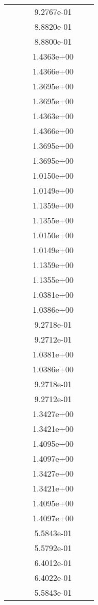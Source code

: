 \begin{xltabular}{\textwidth}{r|rS[table-format=1.3e+2]S[table-format=1.4e+2]S[table-format=1.4e+2]S[table-format=-1.5]}
&  &  & 9.2767e-01 & & \\
&  &  & 8.8820e-01 & & \\
&  &  & 8.8800e-01 & & \\
&  &  & 1.4363e+00 & & \\
&  &  & 1.4366e+00 & & \\
&  &  & 1.3695e+00 & & \\
&  &  & 1.3695e+00 & & \\
&  &  & 1.4363e+00 & & \\
&  &  & 1.4366e+00 & & \\
&  &  & 1.3695e+00 & & \\
&  &  & 1.3695e+00 & & \\
&  &  & 1.0150e+00 & & \\
&  &  & 1.0149e+00 & & \\
&  &  & 1.1359e+00 & & \\
&  &  & 1.1355e+00 & & \\
&  &  & 1.0150e+00 & & \\
&  &  & 1.0149e+00 & & \\
&  &  & 1.1359e+00 & & \\
&  &  & 1.1355e+00 & & \\
&  &  & 1.0381e+00 & & \\
&  &  & 1.0386e+00 & & \\
&  &  & 9.2718e-01 & & \\
&  &  & 9.2712e-01 & & \\
&  &  & 1.0381e+00 & & \\
&  &  & 1.0386e+00 & & \\
&  &  & 9.2718e-01 & & \\
&  &  & 9.2712e-01 & & \\
&  &  & 1.3427e+00 & & \\
&  &  & 1.3421e+00 & & \\
&  &  & 1.4095e+00 & & \\
&  &  & 1.4097e+00 & & \\
&  &  & 1.3427e+00 & & \\
&  &  & 1.3421e+00 & & \\
&  &  & 1.4095e+00 & & \\
&  &  & 1.4097e+00 & & \\
&  &  & 5.5843e-01 & & \\
&  &  & 5.5792e-01 & & \\
&  &  & 6.4012e-01 & & \\
&  &  & 6.4022e-01 & & \\
&  &  & 5.5843e-01 & & \\

\end{xltabular}
